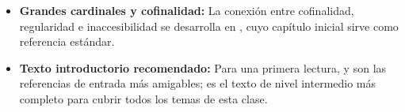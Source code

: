 \begin{itemize}[leftmargin=2em]
  \item \textbf{Grandes cardinales y cofinalidad:} La conexión entre cofinalidad, regularidad e inaccesibilidad se desarrolla en \cite{kanamori2003}, cuyo capítulo inicial sirve como referencia estándar.

  \item \textbf{Texto introductorio recomendado:} Para una primera lectura, \cite{halmos1960} y \cite{enderton1977} son las referencias de entrada más amigables; \cite{hrbacek1999} es el texto de nivel intermedio más completo para cubrir todos los temas de esta clase.
\end{itemize}
